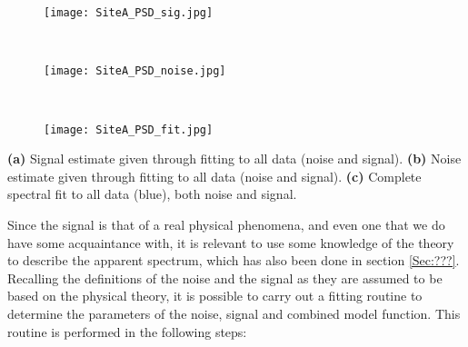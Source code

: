 \documentclass[../../CompleteThesis/Complete_1stDraft.tex]{subfiles}
\begin{document}
	
	\begin{marginfigure}
		\centering
		\begin{subfigure}{\marginparwidth}
			\centering
			\texttt{[image: SiteA\_PSD\_sig.jpg]}
			\caption{\footnotesize}
			\label{fig:SiteA_PSD_sig}
		\end{subfigure}\\[1ex]
		
		\begin{subfigure}{\marginparwidth}
			\centering
			\texttt{[image: SiteA\_PSD\_noise.jpg]}
			\caption{\footnotesize}
			\label{fig:SiteA_PSD_noise}
		\end{subfigure}\\[1ex]
		
		\begin{subfigure}{\marginparwidth}
			\centering
			\texttt{[image: SiteA\_PSD\_fit.jpg]}
			\caption{\footnotesize}
			\label{fig:SiteA_PSD_fit}
		\end{subfigure}
		\caption[Isolated spectral fits, Site A]{\footnotesize\textbf{(a)} Signal estimate given through fitting to all data (noise and signal). \textbf{(b)} Noise estimate given through fitting to all data (noise and signal). \textbf{(c)} Complete spectral fit to all data (blue), both noise and signal.}
		\label{fig:SpectralFitsIsolated}
	\end{marginfigure}
	Since the signal is that of a real physical phenomena, and even one that we do have some acquaintance with, it is relevant to use some knowledge of the theory to describe the apparent spectrum, which has also been done in section \ref{Sec:???}. Recalling the definitions of the noise and the signal as they are assumed to be based on the physical theory, it is possible to carry out a fitting routine to determine the parameters of the noise, signal and combined model function. This routine is performed in the following steps:
\end{document}
